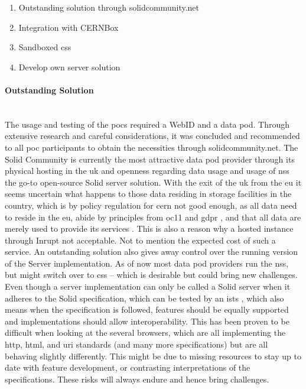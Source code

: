 \begin{enumerate}
    \item Outstanding solution through solidcommunity.net
    \item Integration with CERNBox
    \item Sandboxed \gls{css}
    \item Develop own server solution
\end{enumerate}

\paragraph{Outstanding Solution}\mbox{}\\

The usage and testing of the \glspl{poc} required a WebID and a data pod. Through extensive research and careful considerations, it was concluded and recommended to all \gls{poc} participants to obtain the necessities through solidcommunity.net. The Solid Community is currently the most attractive data pod provider through its physical hosting in the \gls{uk} and openness regarding data usage and usage of \gls{nss} the go-to open-source Solid server solution. With the exit of the \gls{uk} from the \gls{eu} it seems uncertain what happens to those data residing in storage facilities in the country, which is by policy regulation for \gls{cern} not good enough, as all data need to reside in the \gls{eu}, abide by principles from \gls{oc11} \cite{oc11} and  \gls{gdpr} \cite{gdpr}, and that all data are merely used to provide its services \cite{policy-cern-server}. This is also a reason why a hosted instance through Inrupt \cite{inrupt} not acceptable. Not to mention the expected cost of such a service. An outstanding solution also gives away control over the running version of the Server implementation. As of now most data pod providers run the \gls{nss}, but might switch over to \gls{css} -- which is desirable but could bring new challenges. Even though a server implementation can only be called a Solid server when it adheres to the Solid specification, which can be tested by an \gls{ists} \cite{solid-test-suite}, which also means when the specification is followed, features should be equally supported and implementations should allow interoperability. This has been proven to be difficult when looking at the several browsers, which are all implementing the \gls{http}, \gls{html}, and \gls{uri} standards (and many more specifications) but are all behaving slightly differently. This might be due to missing resources to stay up to date with feature development, or contrasting interpretations of the specifications. These risks will always endure and hence bring challenges.
\vspace{0.5cm}
